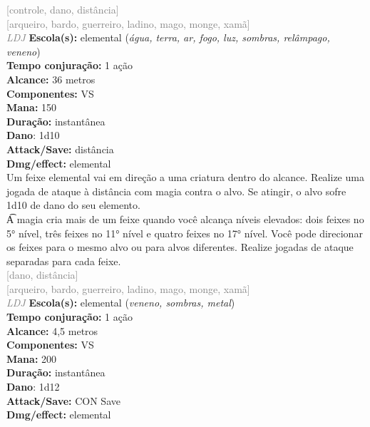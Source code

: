 \documentclass{RPG_Adventure}[2021/10/20]
\begin{document}
{\scriptsize \textcolor{gray}{[controle, dano, distância]\\}}
{\scriptsize \textcolor{gray}{[arqueiro, bardo, guerreiro, ladino, mago, monge, xamã]\\}}
{\tiny \textcolor{gray}{\textit{LDJ}}}\jump{}
{\small \t \textbf{Escola(s):} elemental (\textit{água, terra, ar, fogo, luz, sombras, relâmpago, veneno})\\\t \textbf{Tempo conjuração:} 1 ação\\\t \textbf{Alcance:} 36 metros\\\t \textbf{Componentes:} VS\\\t \textbf{Mana:} 150\\\t \textbf{Duração:} instantânea\\\t \textbf{Dano}: 1d10\\\t \textbf{Attack/Save:} distância\\\t \textbf{Dmg/effect:} elemental\\}
{\normalsize Um feixe elemental vai em direção a uma criatura dentro do alcance. Realize uma jogada de ataque à distância com magia contra o alvo. Se atingir, o alvo sofre 1d10 de dano do seu elemento.\\\t A magia cria mais de um feixe quando você alcança níveis elevados: dois feixes no 5° nível, três feixes no 11° nível e quatro feixes no 17° nível. Você pode direcionar os feixes para o mesmo alvo ou para alvos diferentes. Realize jogadas de ataque separadas para cada feixe.\\}
{\scriptsize \textcolor{gray}{[dano, distância]\\}}
{\scriptsize \textcolor{gray}{[arqueiro, bardo, guerreiro, ladino, mago, monge, xamã]\\}}
{\tiny \textcolor{gray}{\textit{LDJ}}}\jump{}
{\small \t \textbf{Escola(s):} elemental (\textit{veneno, sombras, metal})\\\t \textbf{Tempo conjuração:} 1 ação\\\t \textbf{Alcance:} 4,5 metros\\\t \textbf{Componentes:} VS\\\t \textbf{Mana:} 200\\\t \textbf{Duração:} instantânea\\\t \textbf{Dano}: 1d12\\\t \textbf{Attack/Save:} CON Save\\\t \textbf{Dmg/effect:} elemental\\}
\end{document}
